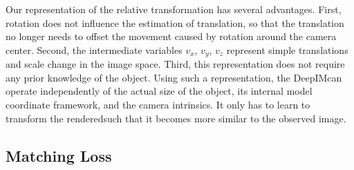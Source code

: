 \documentclass[twocolumn]{svjour3}
\newcommand{\dimnet}[0]{DeepIM}
\newcommand{\rend}[0]{rendered}
\begin{document}

Our representation of the relative transformation has several advantages. First, rotation does not influence the estimation of translation, so that the translation no longer needs to offset the movement caused by rotation around the camera center. Second, the intermediate variables $v_x$, $v_y$, $v_z$ represent simple translations and scale change in the image space. Third, this representation does not require any prior knowledge of the object. Using such a representation, the \dimnet\network  can operate independently of the actual size of the object, its internal model coordinate framework, and the camera intrinsics. It only has to learn to transform the \rend\image such that it becomes more similar to the observed image.


\subsection{Matching Loss}
\label{sec.points_matching_loss}
\end{document}
